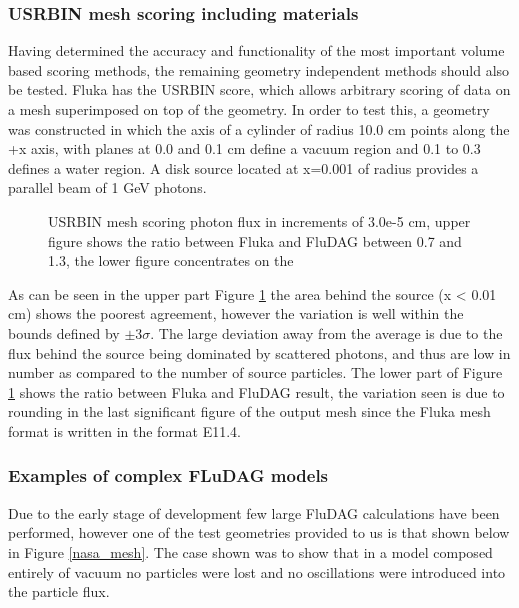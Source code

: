 \documentclass{anstrans}
\begin{document}
\subsubsection*{USRBIN mesh scoring including materials}
Having determined the accuracy and functionality of the most important 
volume based scoring methods, the remaining geometry independent methods
should also be tested.
Fluka has the USRBIN score, which allows arbitrary scoring
of data on a mesh superimposed on top of the geometry. In order to test this, a geometry
was constructed in which the axis of a cylinder of radius 10.0 cm points along the
+x axis, with planes at 0.0 and 0.1 cm define a vacuum region and 0.1 to 0.3 
defines a water region. A disk source located at x=0.001 of radius provides a 
parallel beam of 1 GeV photons.
\begin{figure}[h!]
	\begin{center}
		\caption{USRBIN mesh scoring photon flux in increments
                  of 3.0e-5 cm, upper figure shows the ratio between
                  Fluka and FluDAG between 0.7 and 1.3, the lower
                  figure concentrates on the }
	\end{center}
	\label{mesh_phot}
\end{figure}
As can be seen in the upper part Figure \ref{mesh_phot} the area behind the source 
(x < 0.01 cm) shows the poorest agreement, however the variation is well within the 
bounds defined by $\pm 3\sigma$. The large deviation away from the average is due to 
the flux behind the source being dominated by scattered photons, and thus are low in 
number as compared to the number of source particles.  The lower part of Figure 
\ref{mesh_phot} shows the ratio between Fluka and FluDAG result, the variation seen is 
due to rounding in the last significant figure of the output mesh since the Fluka mesh format is written 
 in the format E11.4. 

\subsubsection{Examples of complex FLuDAG models}
Due to the early stage of development few large FluDAG calculations have been performed, however
one of the test geometries provided to us is that shown below in Figure \ref{nasa_mesh}. The case shown
was to show that in a model composed entirely of vacuum no particles were lost and no oscillations were
introduced into the particle flux.
\end{document}
